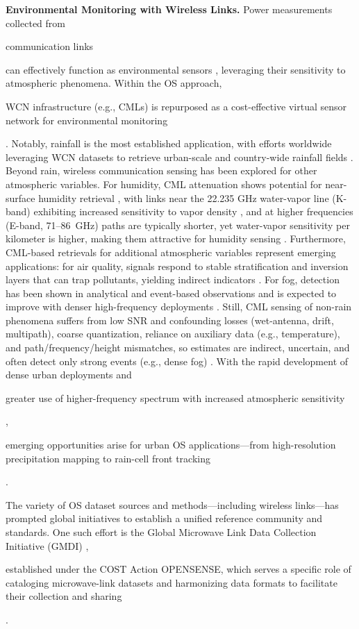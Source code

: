 \documentclass[manuscript]{copernicus}
\newif\ifshowrevisions
\newcommand{\blue}[1]{%
  \ifshowrevisions
    \textcolor{black}{#1}%
  \else
    #1%
  \fi
}
\begin{document}
\noindent \textbf{Environmental Monitoring with Wireless Links.} \label{sec:sensing_overview}
Power measurements collected from \blue{communication links} can effectively function as environmental sensors \citep{messer2006environmental}, leveraging their sensitivity to atmospheric phenomena.
Within the OS approach, \blue{WCN infrastructure (e.g., CMLs) is repurposed as a cost-effective virtual sensor network for environmental monitoring} \citep{upton2005microwave,overeem2011measuring}.
Notably, rainfall is the most established application, with efforts worldwide leveraging WCN datasets to retrieve urban-scale and country-wide rainfall fields \citep{graf2020rainfall,messer2016cellular,overeem2023commercial,chwala2019commercial,zhang2023precipitation,vspavckova2021year}.
Beyond rain, wireless communication sensing has been explored for other atmospheric variables. 
For humidity, CML attenuation shows potential for near-surface humidity retrieval \citep{rubin2022challenges}, with links near the 22.235 GHz water-vapor line (K-band) exhibiting increased sensitivity to vapor density \citep{rubin2023high}, and at higher frequencies (E-band, 71--86~GHz) paths are typically shorter, yet water-vapor sensitivity per kilometer is higher, making them attractive for humidity sensing \citep{fencl2021retrieving}. 
Furthermore, CML-based retrievals for additional atmospheric variables represent emerging applications: for air quality, signals respond to stable stratification and inversion layers that can trap pollutants, yielding indirect indicators \citep{david2016using}. For fog, detection has been shown in analytical and event-based observations and is expected to improve with denser high-frequency deployments \citep{david2015cellular,csurgai2010fog}.
Still, CML sensing of non-rain phenomena suffers from low SNR and confounding losses (wet-antenna, drift, multipath), coarse quantization, reliance on auxiliary data (e.g., temperature), and path/frequency/height mismatches, so estimates are indirect, uncertain, and often detect only strong events (e.g., dense fog) \citep{rubin2022challenges,david2015cellular}.
With the rapid development of dense urban deployments and \blue{greater use of higher-frequency spectrum with increased atmospheric sensitivity}, \blue{emerging opportunities arise for urban OS applications—from high-resolution precipitation mapping to rain-cell front tracking} \citep{ostrometzky2024opportunistic,janco2023city,zhang2023environment,hadar2020parameter}.

The variety of OS dataset sources and methods—including wireless links—has prompted global initiatives to establish a unified reference community and standards. One such effort is the Global Microwave Link Data Collection Initiative (GMDI) \citep{fencl2025new}, \blue{established under the COST Action OPENSENSE, which serves a specific role of cataloging microwave-link datasets and harmonizing data formats to facilitate their collection and sharing}.
\end{document}
